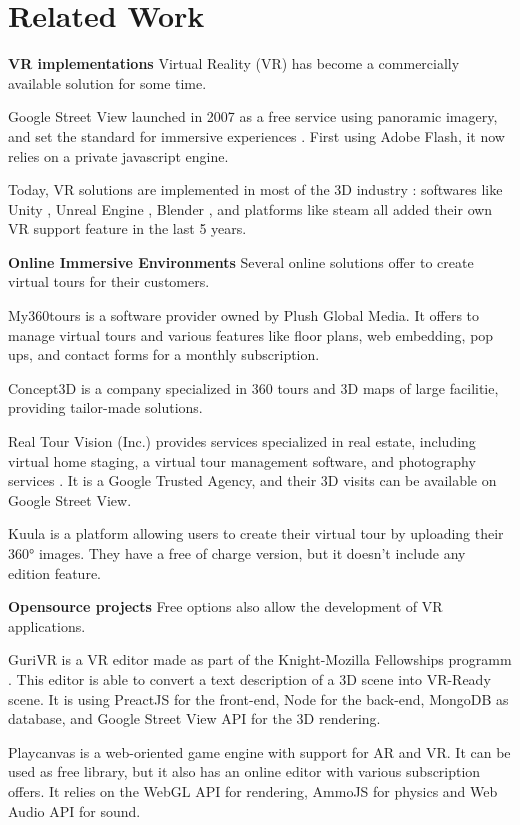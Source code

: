 \section{Related Work}

\textbf{VR implementations} Virtual Reality (VR) has become a commercially available solution for some time. 

Google Street View launched in 2007 as a free service using panoramic imagery, and set the standard for immersive experiences \cite{}. First using Adobe Flash, it now relies on a private javascript engine.

Today, VR solutions are implemented in most of the 3D industry : softwares like Unity \cite{}, Unreal Engine \cite{}, Blender \cite{}, and platforms like steam all added their own VR support feature in the last 5 years. 

\textbf{Online Immersive Environments} Several online solutions offer to create virtual tours for their customers. 

My360tours is a software provider owned by Plush Global Media. It offers to manage virtual tours and various features like floor plans, web embedding, pop ups, and contact forms for a monthly subscription. \cite{}

Concept3D is a company specialized in 360 tours and 3D maps of large facilitie, providing tailor-made solutions. \cite{}

Real Tour Vision (Inc.) provides services specialized in real estate, including virtual home staging, a virtual tour management software, and photography services \cite{}. It is a Google Trusted Agency, and their 3D visits can be available on Google Street View. 

Kuula is a platform allowing users to create their virtual tour by uploading their 360° images. They have a free of charge version, but it doesn't include any edition feature. \cite{}

\textbf{Opensource projects} Free options also allow the development of VR applications.

GuriVR is a VR editor made as part of the Knight-Mozilla Fellowships programm \cite{}. This editor is able to convert a text description of a 3D scene into  VR-Ready scene. It is using PreactJS for the front-end, Node for the back-end, MongoDB as database, and Google Street View API for the 3D rendering. \cite{}

Playcanvas is a web-oriented game engine with support for AR and VR. It can be used as free library, but it also has an online editor with various subscription offers. \cite{} It relies on the WebGL API for rendering, AmmoJS for physics and Web Audio API for sound.

